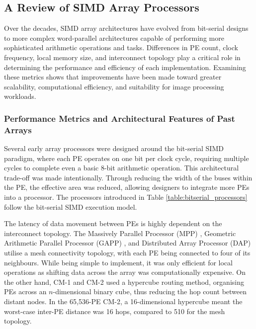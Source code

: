     \subsection{A Review of SIMD Array Processors}
        Over the decades, SIMD array architectures have evolved from bit-serial designs to more complex word-parallel architectures capable of performing more sophisticated arithmetic operations and tasks. Differences in PE count, clock frequency, local memory size, and interconnect topology play a critical role in determining the performance and efficiency of each implementation. Examining these metrics shows that improvements have been made toward greater scalability, computational efficiency, and suitability for image processing workloads.
        
        \subsubsection{Performance Metrics and Architectural Features of Past Arrays}\label{sec:past-arrays}
        
        Several early array processors were designed around the bit-serial SIMD paradigm, where each PE operates on one bit per clock cycle, requiring multiple cycles to complete even a basic 8-bit arithmetic operation. This architectural trade-off was made intentionally. Through reducing the width of the buses within the PE, the effective area was reduced, allowing designers to integrate more PEs into a processor. The processors introduced in Table \ref{table:bitserial_processors} follow the bit-serial SIMD execution model.

        The latency of data movement between PEs is highly dependent on the interconnect topology. The Massively Parallel Processor (MPP) \cite{ref:MPP1998}, Geometric Arithmetic Parallel Processor (GAPP) \cite{ref:GAPP1990}, and Distributed Array Processor (DAP) \cite{ref:ICL_DAP1982} utilise a mesh connectivity topology, with each PE being connected to four of its neighbours. While being simple to implement, it was only efficient for local operations as shifting data across the array was computationally expensive. On the other hand, CM-1 \cite{ref:CM1_1989} and CM-2 \cite{ref:CM2_1987} used a hypercube routing method, organising PEs across an $n$-dimensional binary cube, thus reducing the hop count between distant nodes. In the 65,536-PE CM-2, a 16-dimensional hypercube meant the worst-case inter-PE distance was 16 hops, compared to 510 for the mesh topology.

